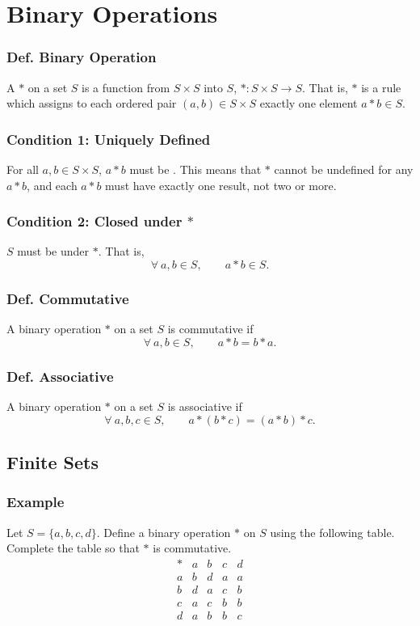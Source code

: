 \section{Binary Operations}

\subsubsection{Def. Binary Operation}
A  $*$ on a set $S$ is a function from $S \times S$ into $S$, $*: S \times S \rightarrow S$. That is, $*$ is a rule which assigns to each ordered pair $(a,b) \in S \times S$ exactly one element $a * b \in S$.

\subsubsection*{Condition 1: Uniquely Defined}
For all $a,b \in S \times S$, $a * b$ must be . This means that $*$ cannot be undefined for any $a * b$, and each $a * b$ must have exactly one result, not two or more.

\subsubsection*{Condition 2: Closed under $*$}
$S$ must be  under $*$. That is,
\[
    \forall~ a,b \in S, \qquad a * b \in S.
\]

\subsubsection{Def. Commutative}
A binary operation $*$ on a set $S$ is commutative if
\[
    \forall~ a,b \in S, \qquad a * b = b * a.
\]

\subsubsection{Def. Associative}
A binary operation $*$ on a set $S$ is associative if
\[
    \forall~ a,b,c \in S, \qquad a * (b * c) = (a * b) * c.
\]

\subsection{Finite Sets}

\subsubsection*{Example}
Let $S = \{a,b,c,d\}$. Define a binary operation $*$ on $S$ using the following table. Complete the table so that $*$ is commutative.
\[
    \begin{array}{c|cccc}
        * & a & b & c & d \\
        \hline
        a & b & d & a & a \\
        b & d & a & c & b \\
        c & a & c & b & b \\
        d & a & b & b & c 
    \end{array}
\]

